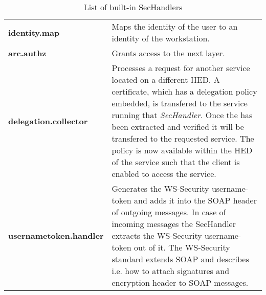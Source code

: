   \begin{table}[htb]
  \centering
  \caption{List of built-in SecHandlers}
  \label{tbl:list_of_sechandler}
  \begin{tabular*}{\textwidth}[t]{p{4cm}p{11cm}}
	\hline
 	\textbf{identity.map}         & Maps the identity of the user to an identity of the workstation.\\
 	\textbf{arc.authz}            & Grants access to the next layer.\\
 	\textbf{delegation.collector} & Processes a request for another service located on a different HED.
                                        A certificate, which has a delegation policy embedded, is transfered to the service running that \textit{SecHandler}. Once the has been extracted and verified it will be transfered
                                        to the requested service.
                                        The policy is now available within the HED of the service such that the client is enabled to access the service.\\
 	\textbf{usernametoken.handler}& Generates the WS-Security username-token and adds it into the SOAP header of outgoing
					 messages. In case of incoming messages the SecHandler extracts the WS-Security username-token out of it. The WS-Security standard extends SOAP and describes i.e. how to attach signatures and encryption header to SOAP messages.\\
	\hline
  \end{tabular*}
  \end{table}
%
